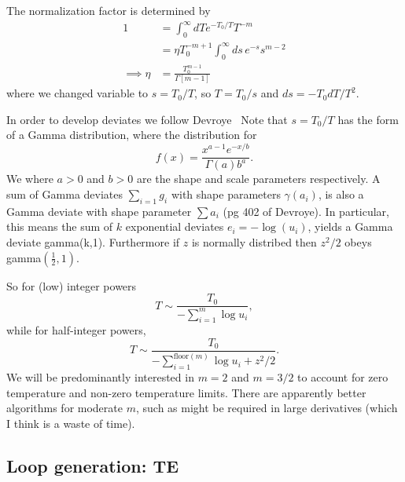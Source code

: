 The normalization factor is determined by
\begin{align}
   1&= \int_0^\infty dT e^{-T_0/T} T^{-m}\\
  &= \eta T_0^{-m+1}\int_0^\infty ds\, e^{-s}s^{m-2}\\
 \implies \eta &= \frac{T_0^{m-1}}{\Gamma[m-1]}
\end{align}
where we changed variable to $s=T_0/T$, so $T=T_0/s$ and $ds=-T_0 dT/T^2$.  


In order to develop deviates we follow Devroye~\cite{Devroye2003}
Note that $s=T_0/T$ has the form of a Gamma distribution, where the distribution for   
\begin{equation}
  f(x) = \frac{x^{a-1} e^{-x/b}}{\Gamma(a)b^a}.  
\end{equation}
We
where $a>0$ and $b>0$ are the shape and scale parameters respectively.  
A sum of Gamma deviates $\sum_{i=1}g_i$ with shape parameters $\gamma(a_i)$, is also a Gamma deviate
with shape parameter $\sum a_i$ (pg 402 of Devroye).  
In particular, this means the sum of $k$ exponential deviates $e_i=-\log(u_i)$, yields a Gamma 
deviate gamma(k,1).  Furthermore if $z$ is normally distribed then $z^2/2$ obeys gamma$\left(\frac{1}{2},1\right)$.

So for (low) integer powers 
\begin{equation}
  T\sim \frac{T_0}{-\sum_{i=1}^{m}\log u_i},
\end{equation}
while for half-integer powers, 
\begin{equation}
  T\sim \frac{T_0}{-\sum_{i=1}^{\text{floor}(m)}\log u_i+z^2/2}.
\end{equation}
We will be predominantly interested in $m=2$ and $m=3/2$ to account for zero temperature
and non-zero temperature limits.  There are apparently better algorithms for moderate $m$,
such as might be required in large derivatives (which I think is a waste of time).

\subsection{Loop generation: TE}

